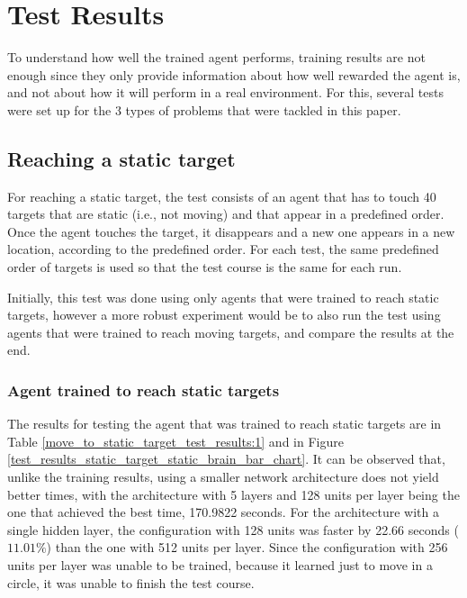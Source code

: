 \chapter{Test Results}

To understand how well the trained agent performs, training results are not enough since they only provide information about how well rewarded the agent is, and not about how it will perform in a real environment. For this, several tests were set up for the 3 types of problems that were tackled in this paper.


\section{Reaching a static target} \label{test_reach_static_target}

For reaching a static target, the test consists of an agent that has to touch 40 targets that are static (i.e., not moving) and that appear in a predefined order. Once the agent touches the target, it disappears and a new one appears in a new location, according to the predefined order. For each test, the same predefined order of targets is used so that the test course is the same for each run. 

Initially, this test was done using only agents that were trained to reach static targets, however a more robust experiment would be to also run the test using agents that were trained to reach moving targets, and compare the results at the end.


\subsection{Agent trained to reach static targets}

The results for testing the agent that was trained to reach static targets are in Table \ref{move_to_static_target_test_results:1} and in Figure \ref{test_results_static_target_static_brain_bar_chart}. It can be observed that, unlike the training results, using a smaller network architecture does not yield better times, with the architecture with 5 layers and 128 units per layer being the one that achieved the best time, 170.9822 seconds. For the architecture with a single hidden layer, the configuration with 128 units was faster by 22.66 seconds ($11.01\%$) than the one with 512 units per layer. Since the configuration with 256 units per layer was unable to be trained, because it learned just to move in a circle, it was unable to finish the test course.

